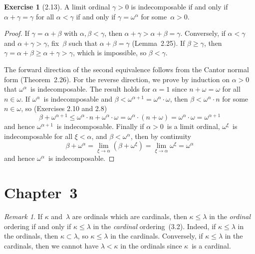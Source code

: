 \documentclass[letterpaper,12pt]{article}
\newcommand{\mult}{\cdot}
\theoremstyle{definition}
\newtheorem*{exer}{Exercise}
\theoremstyle{remark}
\newtheorem*{rmk}{Remark}
\begin{document}
\begin{exer}[2.13]
A limit ordinal \(\gamma>0\) is indecomposable if and only if \(\alpha+\gamma=\gamma\) for all \(\alpha<\gamma\) if and only if \(\gamma=\omega^{\alpha}\) for some~\(\alpha>0\).
\end{exer}
\begin{proof}
If \(\gamma=\alpha+\beta\) with \(\alpha,\beta<\gamma\), then \(\alpha+\gamma>\alpha+\beta=\gamma\). Conversely, if \(\alpha<\gamma\) and \(\alpha+\gamma>\gamma\), fix~\(\beta\) such that \(\alpha+\beta=\gamma\) (Lemma~2.25). If \(\beta\ge\gamma\), then \(\gamma=\alpha+\beta\ge\alpha+\gamma>\gamma\), which is impossible, so \(\beta<\gamma\).

The forward direction of the second equivalence follows from the Cantor normal form (Theorem~2.26). For the reverse direction, we prove by induction on \(\alpha>0\) that \(\omega^{\alpha}\)~is indecomposable. The result holds for \(\alpha=1\) since \(n+\omega=\omega\) for all \(n\in\omega\). If \(\omega^{\alpha}\)~is indecomposable and \(\beta<\omega^{\alpha+1}=\omega^{\alpha}\mult\omega\), then \(\beta<\omega^{\alpha}\mult n\) for some \(n\in\omega\), so (Exercises 2.10 and 2.8)
\[\beta+\omega^{\alpha+1}\le\omega^{\alpha}\mult n+\omega^{\alpha}\mult\omega=\omega^{\alpha}\mult(n+\omega)=\omega^{\alpha}\mult\omega=\omega^{\alpha+1}\]
and hence \(\omega^{\alpha+1}\)~is indecomposable. Finally if \(\alpha>0\)~is a limit ordinal, \(\omega^{\xi}\)~is indecomposable for all \(\xi<\alpha\), and \(\beta<\omega^{\alpha}\), then by continuity
\[\beta+\omega^{\alpha}=\lim_{\xi\to\alpha}(\beta+\omega^{\xi})=\lim_{\xi\to\alpha}\omega^{\xi}=\omega^{\alpha}\]
and hence \(\omega^{\alpha}\)~is indecomposable.
\end{proof}

\section*{Chapter~3}
\begin{rmk}
If \(\kappa\) and~\(\lambda\) are ordinals which are cardinals, then \(\kappa\le\lambda\) in the \emph{ordinal} ordering if and only if \(\kappa\le\lambda\) in the \emph{cardinal} ordering~(3.2). Indeed, if \(\kappa\le\lambda\) in the ordinals, then \(\kappa\subset\lambda\), so \(\kappa\le\lambda\) in the cardinals. Conversely, if \(\kappa\le\lambda\) in the cardinals, then we cannot have \(\lambda<\kappa\) in the ordinals since \(\kappa\)~is a cardinal.
\end{rmk}
\end{document}
